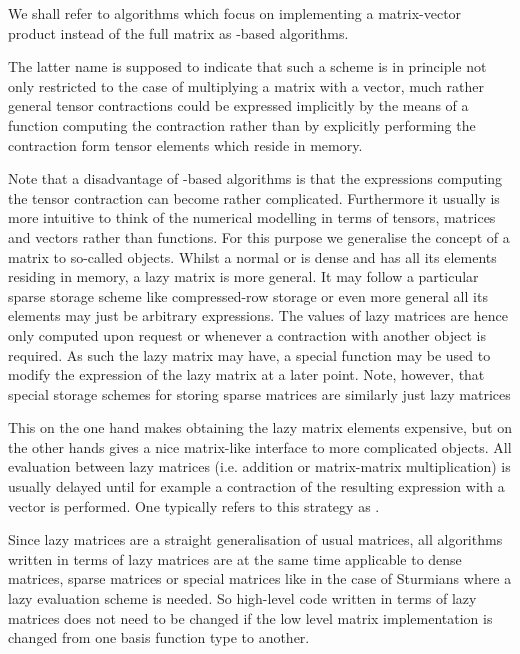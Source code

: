 We shall refer to algorithms which focus on implementing a matrix-vector product
instead of the full matrix as \contraction-based algorithms.

The latter name is supposed to indicate that such a scheme is in principle
not only restricted to the case of multiplying a matrix with a vector,
much rather general tensor contractions could be expressed implicitly
by the means of a function computing the contraction rather than
by explicitly performing the contraction form tensor elements
which reside in memory.

Note that a disadvantage of \contraction-based algorithms is that the expressions
computing the tensor contraction can become rather complicated.
Furthermore it usually is more intuitive to think of the
numerical modelling in terms of tensors, matrices and vectors
rather than \contraction functions.
For this purpose we generalise the concept of a matrix
to so-called  objects.
Whilst a normal or  is dense and has all its elements
residing in memory,
a lazy matrix is more general.
It may follow a particular sparse storage scheme
like compressed-row storage
or even more general all its elements may just be arbitrary expressions.
The values of lazy matrices are hence only computed upon request
or whenever a contraction with another object is required.
As such the lazy matrix may have, \ie a special \update function
may be used to modify the expression of the lazy matrix
at a later point.
Note, however, that special storage schemes for storing
sparse matrices are similarly just lazy matrices 

This on the one hand makes obtaining the lazy matrix elements
expensive, but on the other hands gives a nice matrix-like
interface to more complicated objects.
All evaluation between lazy matrices
(i.e. addition or matrix-matrix multiplication)
is usually delayed until for example a contraction of the resulting
expression with a vector is performed.
One typically refers to this strategy as .

Since lazy matrices are a straight generalisation
of usual matrices,
all algorithms written in terms of lazy matrices
are at the same time applicable to dense matrices,
sparse matrices or special matrices like in the case of Sturmians
where a lazy evaluation scheme is needed.
So high-level code written in terms of lazy matrices
does not need to be changed if the low level matrix implementation
is changed from one basis function type to another.
%
%



